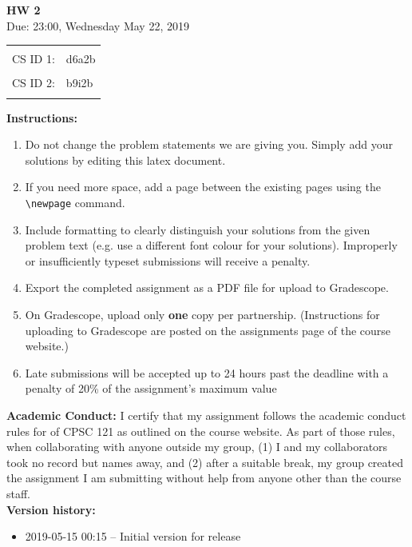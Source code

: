 \documentclass[a4paper, 20pt]{article}
\begin{document}

\begin{center}
    \LARGE
    \textbf{HW 2}
    \\[1ex]
    \Large Due: 23:00, Wednesday May 22, 2019\\
\end{center}
    \LARGE
\begin{tabular}{rl}
 & \\
CS ID 1: &  d6a2b\\
 & \\
CS ID 2: & b9i2b\\
 & \\
\end{tabular}
\large

\textbf{Instructions:}
\begin{enumerate}
\item Do not change the problem statements we are giving you. Simply add your solutions by editing this latex document. 
\item If you need more space, add a page between the existing pages using the \texttt{\textbackslash newpage} command.
\item Include formatting to clearly distinguish your solutions from the given problem text (e.g. use a different font colour for your solutions). Improperly or insufficiently typeset submissions will receive a penalty.
\item Export the completed assignment as a PDF file for upload to Gradescope.
\item On Gradescope, upload only \textbf{one} copy per partnership. (Instructions for uploading to Gradescope are posted on the assignments page of the course website.)
\item Late submissions will be accepted up to 24 hours past the deadline with a penalty of 20\% of the assignment’s maximum value
\end{enumerate}

\textbf{Academic Conduct:} 
I certify that my assignment follows the academic conduct rules for of CPSC 121 as outlined on the course website. As part of those rules, when collaborating with anyone outside my group, (1) I and my collaborators took no record but names away, and (2) after a suitable break, my group created the assignment I am submitting without help from anyone other than the course staff. \\

\textbf{Version history:}
\begin{itemize}
    \item 2019-05-15 00:15 -- Initial version for release
\end{itemize}
\end{document}
